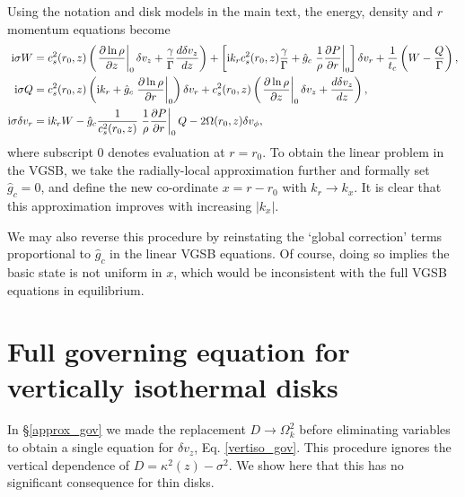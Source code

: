 Using the notation and disk models in the main text, the
energy, density and $r$ momentum equations become 
\begin{align}
  \mathrm{i} \sigma W  &=c _s^2(r_0, z)\left( \left.\frac{\partial\ln\rho}{\partial
      z}\right|_0 \delta v_z + \frac{\gamma}{\Gamma} \frac{d\delta
    v_z}{dz}\right) + \left[\mathrm{i} k_rc_s^2(r_0,z)
  \frac{\gamma}{\Gamma} + \hat{g}_c\left.\frac{1}{\rho}\frac{\partial P}{\partial
      r}\right|_0\right]\delta v_r  +
\frac{1}{t_c}\left(W-\frac{Q}{\Gamma}\right),\\
\mathrm{i} \sigma Q &= c_s^2(r_0,z)\left(\mathrm{i} k_r + \hat{g}_c
  \left.\frac{\partial\ln{\rho}}{\partial r}\right|_0\right)\delta v_r + c _s^2(r_0, z)\left( \left.\frac{\partial\ln\rho}{\partial
      z}\right|_0 \delta v_z + \frac{d\delta
    v_z}{dz}\right), \\
\mathrm{i} \sigma \delta v_r & = \mathrm{i} k_r W  -
\hat{g}_c\frac{1}{c_s^2(r_0,z)}\left.\frac{1}{\rho}\frac{\partial P}{\partial
  r}\right|_0Q - 2\Omega(r_0,z)\delta v_\phi,
\end{align}
where subscript $0$ denotes evaluation at $r=r_0$. To obtain the
linear problem in the VGSB, we take the radially-local 
approximation further and formally set $\hat{g}_c=0$, and define the
new co-ordinate $x=r - r_0$ with $k_r\to k_x$. It is clear that
this approximation improves with increasing $|k_x|$. 

We may also reverse this procedure by reinstating the `global
correction' terms proportional to $\hat{g}_c$ in the linear VGSB
equations. Of course, doing so implies the basic state is not uniform
in $x$, which would be inconsistent with the full VGSB equations in
equilibrium. 
 




\section{Full governing equation for vertically isothermal disks}\label{adia_improve}
In \S\ref{approx_gov} we made the replacement $D\to\Omega_k^2$ before
eliminating variables to obtain a single equation for $\delta v_z$,
Eq. \ref{vertiso_gov}.  This procedure ignores the vertical dependence of
$D=\kappa^2(z) - \sigma^2$. We show here that this has no significant
consequence for thin disks. 

